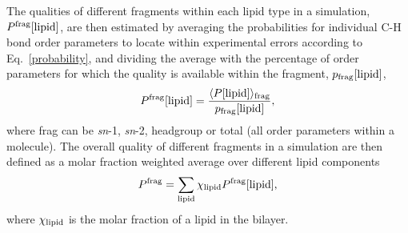 \documentclass[fleqn,10pt]{wlscirep}
\begin{document}
The qualities of different fragments within each lipid type in a simulation, $P^{\rm frag}[{\rm lipid}]$, are then estimated by averaging the probabilities for individual C-H bond order parameters to locate within experimental errors according to Eq.~\ref{probability}, and dividing the average with the percentage of order parameters for which the quality is available within the fragment, $p_{\rm frag}[{\rm lipid}]$,
\begin{equation}
    P^{\rm frag}[{\rm lipid}] = \frac{\langle P[{\rm lipid}]\rangle_{\rm frag}}{p_{\rm frag}[{\rm lipid}]},
\end{equation}
 where frag can be {\it sn}-1, {\it sn}-2, headgroup or total (all order parameters within a molecule). The overall quality of different fragments in a simulation are then defined as a molar fraction weighted average over different lipid components
\begin{equation}
    P^{\rm frag} = \sum_{\rm lipid} \chi_{\rm lipid} P^{\rm frag}[{\rm lipid}],
\end{equation}
where $\chi_{\rm lipid}$ is the molar fraction of a lipid in the bilayer.
\end{document}
